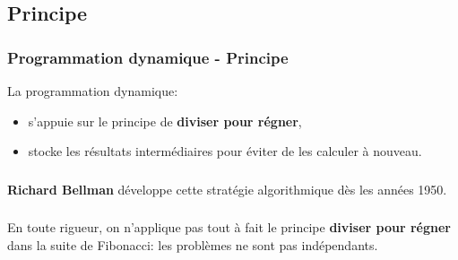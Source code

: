 \documentclass[svgnames,11pt]{beamer}
\begin{document}
\subsection{Principe}
\begin{frame}
    \frametitle{Programmation dynamique - Principe}
La programmation dynamique:
    \begin{itemize}
        \item s'appuie sur le principe de \textbf{diviser pour régner},
        \item stocke les résultats intermédiaires pour éviter de les calculer à nouveau.
    \end{itemize}

\end{frame}
\begin{frame}
    \frametitle{}

    \begin{aretenir}[Remarque]
    \textbf{Richard Bellman} développe cette stratégie algorithmique dès les années 1950.
    \end{aretenir}

    
\end{frame}
\begin{frame}
    \frametitle{}

    \begin{aretenir}[Remarque]
        En toute rigueur, on n'applique pas tout à fait le principe \textbf{diviser pour régner} dans la suite de Fibonacci: les problèmes ne sont pas indépendants.
        \end{aretenir}

\end{frame}
\end{document}
